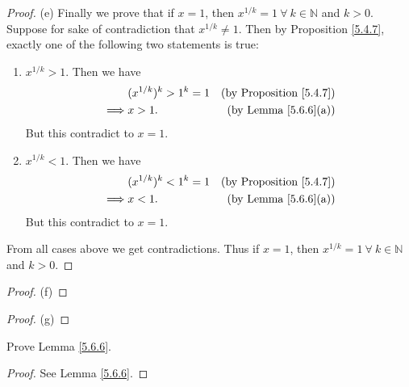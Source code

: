 \begin{proof}{(e)}
Finally we prove that if \(x = 1\), then \(x^{1 / k} = 1 \ \forall\ k \in \mathds{N}\) and \(k > 0\).
Suppose for sake of contradiction that \(x^{1 / k} \neq 1\).
Then by Proposition \ref{5.4.7}, exactly one of the following two statements is true:
\begin{enumerate}[label=(\Roman*)]
    \item \(x^{1 / k} > 1\).
    Then we have
    \begin{align*}
        & (x^{1 / k})^k > 1^k = 1 & \text{(by Proposition \ref{5.4.7})} \\
        \implies & x > 1. & \text{(by Lemma \ref{5.6.6}(a))}
    \end{align*}
    But this contradict to \(x = 1\).
    \item \(x^{1 / k} < 1\).
    Then we have
    \begin{align*}
        & (x^{1 / k})^k < 1^k = 1 & \text{(by Proposition \ref{5.4.7})} \\
        \implies & x < 1. & \text{(by Lemma \ref{5.6.6}(a))}
    \end{align*}
    But this contradict to \(x = 1\).
\end{enumerate}
From all cases above we get contradictions.
Thus if \(x = 1\), then \(x^{1 / k} = 1 \ \forall\ k \in \mathds{N}\) and \(k > 0\).
\end{proof}

\begin{proof}{(f)}

\end{proof}

\begin{proof}{(g)}

\end{proof}

\exercisesection

\begin{exercise}\label{ex 5.6.1}
Prove Lemma \ref{5.6.6}.
\end{exercise}

\begin{proof}
See Lemma \ref{5.6.6}.
\end{proof}